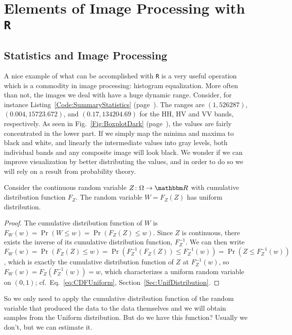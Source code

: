 \chapter[Elements of Image Processing with \texttt{{R}}]{Elements of Image Processing with \texttt{{R}}}\label{Chapter:ElementsR}

\section{Statistics and Image Processing}

A nice example of what can be accomplished with \texttt R is a very useful operation which is a commodity in image processing: histogram equalization.
More often than not, the images we deal with have a huge dynamic range.
Consider, for instance Listing~\ref{Code:SummaryStatistics} (page~\pageref{Code:SummaryStatistics}).
The ranges are 
$(1,526287)$, $(0.004,15723.672) $, and $(0.17,134204.69)$ for the HH, HV and VV bands, respectively.
As seen in Fig.~\ref{Fig:BoxplotDark} (page~\pageref{Fig:BoxplotDark}), the values are fairly concentrated in the lower part.
If we simply map the minima and maxima to black and white, and linearly the intermediate values into gray levels, both individual bands and any composite image will look black.
We wonder if we can improve visualization by better distributing the values, and in order to do so we will rely on a result from probability theory.

\begin{theorem}\label{Theo:FZ}
Consider the continuous random variable $Z\colon \Omega\to\mathbbm R$ with cumulative distribution function $F_Z$.
The random variable $W=F_Z(Z)$ has uniform distribution.
\end{theorem}

\begin{proof}
The cumulative distribution function of $W$ is $F_W(w)=\Pr(W\leq w)=\Pr(F_Z(Z)\leq w)$.
Since $Z$ is continuous, there exists the inverse of its cumulative distribution function, $F^{-1}_Z$.
We can then write 
$F_W(w)=\Pr(F_Z(Z)\leq w) = \Pr(F^{-1}_Z(F_Z(Z)) \leq F_Z^{-1}(w)) = \Pr(Z\leq F^{-1}_Z(w))$, 
which is exactly the cumulative distribution function of $Z$ at $F^{-1}_Z(w)$, so $F_W(w)=F_Z(F^{-1}_Z(w))=w$, which characterizes a uniform random variable on $(0,1)$; cf.\ Eq.~\eqref{eq:CDFUniform}, Section~\ref{Sec:UnifDistribution}.
\end{proof}

So we only need to apply the cumulative distribution function of the random variable that produced the data to the data themselves and we will obtain samples from the Uniform distribution.
But do we have this function?
Usually we don't, but we can estimate it.

